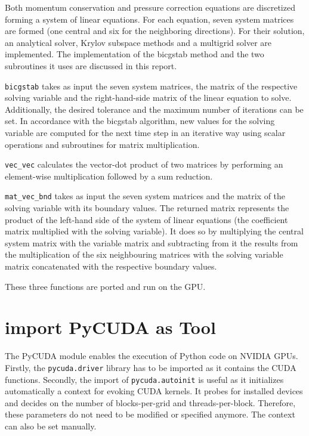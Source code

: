 \documentclass[11pt]{article}
\begin{document}
Both momentum conservation and pressure correction equations are discretized forming a system of linear equations. For each equation, seven system matrices are formed (one central and six for the neighboring directions). For their solution, an analytical solver, Krylov subspace methods and a multigrid solver are implemented. The implementation of the bicgstab method and the two subroutines it uses are discussed in this report.

\texttt{bicgstab} takes as input the seven system matrices, the matrix of the respective solving variable and the right-hand-side matrix of the linear equation to solve. Additionally, the desired tolerance and the maximum number of iterations can be set. In accordance with the bicgstab algorithm, new values for the solving variable are computed for the next time step in an iterative way using scalar operations and subroutines for matrix multiplication. 

\texttt{vec\_vec} calculates the vector-dot product of two matrices by performing an element-wise multiplication followed by a sum reduction.

\texttt{mat\_vec\_bnd} takes as input the seven system matrices and the matrix of the solving variable with its boundary values. The returned matrix represents the product of the left-hand side of the system of linear equations (the coefficient matrix multiplied with the solving variable). It does so by multiplying the central system matrix with the variable matrix and subtracting from it the results from the multiplication of the six neighbouring matrices with the solving variable matrix concatenated with the respective boundary values.

These three functions are ported and run on the GPU.

\section{import PyCUDA as Tool}

The PyCUDA module enables the execution of Python code on NVIDIA GPUs. Firstly, the \texttt{pycuda.driver} library has to be imported as it contains the CUDA functions. Secondly, the import of \texttt{pycuda.autoinit} is useful as it initializes automatically a context for evoking CUDA kernels. It probes for installed devices and decides on the number of blocks-per-grid and threads-per-block. Therefore, these parameters do not need to be modified or specified anymore. The context can also be set manually. 
\end{document}
